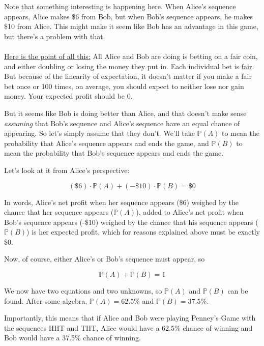 \documentclass[english,12pt,a4paper,final]{article}
\begin{document}
Note that something interesting is happening here. When Alice's sequence appears, Alice makes \$6 from Bob, but when Bob's sequence appears, he makes \$10 from Alice. This might make it seem like Bob has an advantage in this game, but there's a problem with that.
\\\\
\underline{Here is the point of all this:} All Alice and Bob are doing is betting on a fair coin, and either doubling or losing the money they put in. Each individual bet is \underline{fair}. But because of the linearity of expectation, it doesn't matter if you make a fair bet once or 100 times, on average, you should expect to neither lose nor gain money. Your expected profit should be 0.

But it seems like Bob is doing better than Alice, and that doesn't make sense \textit{assuming} that Bob's sequence and Alice's sequence have an equal chance of appearing. So let's simply assume that they don't. We'll take $\mathbb{P}(A)$ to mean the probability that Alice's sequence appears and ends the game, and $\mathbb{P}(B)$ to mean the probability that Bob's sequence appears and ends the game.

Let's look at it from Alice's perspective:

\begin{equation*}
	(\$6) \cdot \mathbb{P}(A)  + (-\$10) \cdot \mathbb{P}(B) = \$0
\end{equation*}

In words, Alice's net profit when her sequence appears (\$6) weighed by the chance that her sequence appears ($\mathbb{P}(A)$), added to Alice's net profit when Bob's sequence appears (-\$10) weighed by the chance that his sequence appears ($\mathbb{P}(B)$) is her expected profit, which for reasons explained above must be exactly \$0.

Now, of course, either Alice's or Bob's sequence must appear, so

\begin{equation}\label{PA+PB=1}
	\mathbb{P}(A) + \mathbb{P}(B) = 1
\end{equation}

We now have two equations and two unknowns, so $\mathbb{P}(A)$ and $\mathbb{P}(B)$ can be found. After some algebra, $\mathbb{P}(A) = 62.5\%$ and $\mathbb{P}(B) = 37.5\%$.

Importantly, this means that if Alice and Bob were playing Penney's Game with the sequences HHT and THT, Alice would have a 62.5\% chance of winning and Bob would have a 37.5\% chance of winning.
\end{document}
